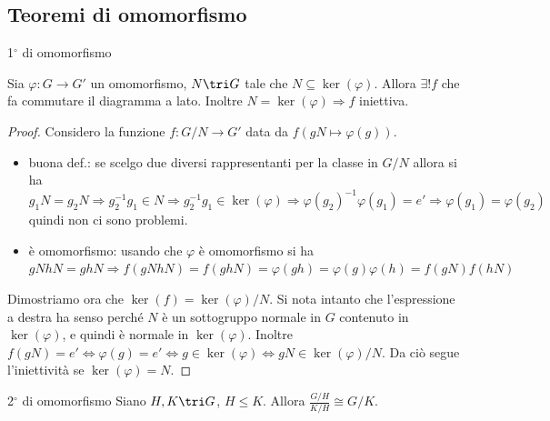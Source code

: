 \subsection{Teoremi di omomorfismo}
\begin{theorem}{1$^{\circ}$ di omomorfismo}
    \newline
    \begin{minipage}{0.7\textwidth}
    Sia $\varphi : G \rightarrow G'$ un omomorfismo, $N \tri G$ tale che $N \subseteq \ker(\varphi)$. Allora $\exists ! f$ che fa commutare il diagramma a lato. Inoltre $N = \ker(\varphi) \Rightarrow f$ iniettiva.
    \end{minipage}\hfill\hfill
    \begin{minipage}{0.1\textwidth}  
    \end{minipage}\hfill
    \begin{minipage}{0.2\textwidth}  
    \end{minipage}\hfill
\end{theorem}
\begin{proof}
    Considero la funzione $f : G/N \rightarrow G'$ data da $f(gN\mapsto \varphi(g))$.
    \begin{itemize}
        \item buona def.: se scelgo due diversi rappresentanti per la classe in $G/N$  allora si ha $g_1N = g_2N \Rightarrow g_2^{-1}g_1 \in N \Rightarrow g_2^{-1}g_1 \in \ker(\varphi) \Rightarrow \varphi(g_2)^{-1}\varphi(g_1) = e' \Rightarrow \varphi(g_1) = \varphi(g_2)$ quindi non ci sono problemi.
        \item è omomorfismo: usando che $\varphi$ è omomorfismo si ha $gNhN = ghN \Rightarrow f(gNhN) = f(ghN) = \varphi(gh) = \varphi(g)\varphi(h) = f(gN)f(hN)$ 
    \end{itemize}
    Dimostriamo ora che $\ker(f) = \ker(\varphi)/N$. Si nota intanto che l'espressione a destra ha senso perché $N$ è un sottogruppo normale in $G$ contenuto in $\ker(\varphi)$, e quindi è normale in $\ker(\varphi)$. Inoltre $f(gN) = e' \iff \varphi(g) = e' \iff g \in \ker(\varphi) \iff gN \in \ker(\varphi)/N$. Da ciò segue l'iniettività se $\ker(\varphi)= N$.
\end{proof}
\begin{theorem}{2$^{\circ}$ di omomorfismo}
    Siano $H,K \tri G$, $H \leq K$. Allora $\frac{G/H}{K/H} \cong G/K$.
\end{theorem}
